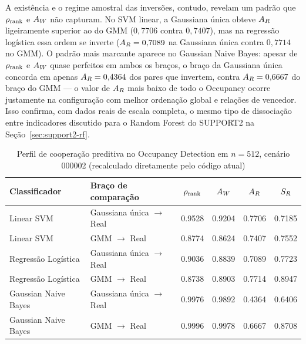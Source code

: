A existência e o regime amostral das inversões, contudo, revelam um padrão que $\rho_{\mathrm{rank}}$ e $A_W$ não capturam. No SVM linear, a Gaussiana única obteve $A_R$ ligeiramente superior ao do GMM ($0{,}7706$ contra $0{,}7407$), mas na regressão logística essa ordem se inverte ($A_R=0{,}7089$ na Gaussiana única contra $0{,}7714$ no GMM). O padrão mais marcante aparece no Gaussian Naive Bayes: apesar de $\rho_{\mathrm{rank}}$ e $A_W$ quase perfeitos em ambos os braços, o braço da Gaussiana única concorda em apenas $A_R=0{,}4364$ dos pares que invertem, contra $A_R=0{,}6667$ do braço do GMM --- o valor de $A_R$ mais baixo de todo o Occupancy ocorre justamente na configuração com melhor ordenação global e relações de vencedor. Isso confirma, com dados reais de escala completa, o mesmo tipo de dissociação entre indicadores discutido para o Random Forest do SUPPORT2 na Seção~\ref{sec:support2-rf}.

\begin{table}[H]
  \centering
  \caption{Perfil de cooperação preditiva no Occupancy Detection em $n=512$, cenário 000002 (recalculado diretamente pelo código atual)}
  \label{tab:occupancy-final}
  \begin{adjustbox}{max width=\textwidth}
  \begin{tabular}{llSSSS}
    \toprule
    Classificador & Braço de comparação & {$\rho_{\mathrm{rank}}$} & {$A_W$} & {$A_R$} & {$S_R$} \\
    \midrule
    Linear SVM & Gaussiana única $\rightarrow$ Real & 0.9528 & 0.9204 & 0.7706 & 0.7185 \\
    Linear SVM & GMM $\rightarrow$ Real             & 0.8774 & 0.8624 & 0.7407 & 0.7552 \\
    Regressão Logística & Gaussiana única $\rightarrow$ Real & 0.9036 & 0.8839 & 0.7089 & 0.7723 \\
    Regressão Logística & GMM $\rightarrow$ Real             & 0.8738 & 0.8903 & 0.7714 & 0.8947 \\
    Gaussian Naive Bayes & Gaussiana única $\rightarrow$ Real & 0.9976 & 0.9892 & 0.4364 & 0.6406 \\
    Gaussian Naive Bayes & GMM $\rightarrow$ Real             & 0.9996 & 0.9978 & 0.6667 & 0.8708 \\
    \bottomrule
  \end{tabular}
  \end{adjustbox}
\end{table}

